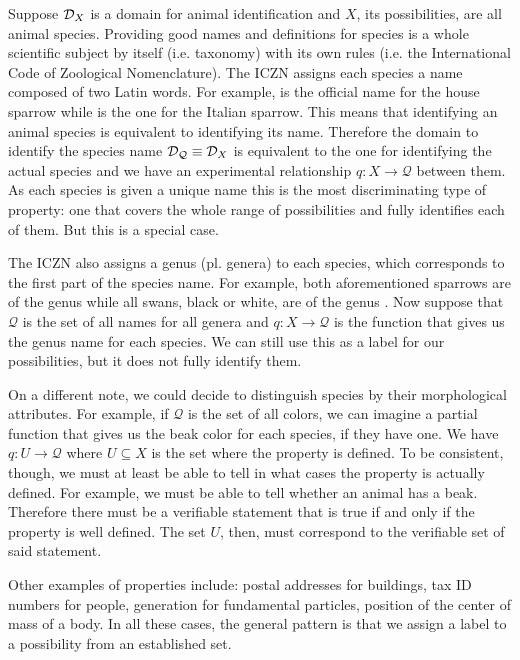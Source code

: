 \documentclass[11pt,letterpaper,fleqn]{memoir} %
\begin{document}
Suppose $\mathcal{D}_X$ is a domain for animal identification and $X$, its possibilities, are all animal species. Providing good names and definitions for species is a whole scientific subject by itself (i.e. taxonomy) with its own rules (i.e. the International Code of Zoological Nomenclature). The ICZN assigns each species a name composed of two Latin words. For example,  is the official name for the house sparrow while  is the one for the Italian sparrow. This means that identifying an animal species is equivalent to identifying its name. Therefore the domain to identify the species name $\mathcal{D}_{\mathcal{Q}} \equiv \mathcal{D}_X$ is equivalent to the one for identifying the actual species and we have an experimental relationship $q: X \to \mathcal{Q}$ between them. As each species is given a unique name this is the most discriminating type of property: one that covers the whole range of possibilities and fully identifies each of them. But this is a special case.

The ICZN also assigns a genus (pl. genera) to each species, which corresponds to the first part of the species name. For example, both aforementioned sparrows are of the genus  while all swans, black or white, are of the genus . Now suppose that $\mathcal{Q}$ is the set of all names for all genera and $q: X \to \mathcal{Q}$ is the function that gives us the genus name for each species. We can still use this as a label for our possibilities, but it does not fully identify them.

On a different note, we could decide to distinguish species by their morphological attributes. For example, if $\mathcal{Q}$ is the set of all colors, we can imagine a partial function that gives us the beak color for each species, if they have one. We have $q: U \to \mathcal{Q}$ where $U \subseteq X$ is the set where the property is defined. To be consistent, though, we must at least be able to tell in what cases the property is actually defined. For example, we must be able to tell whether an animal has a beak. Therefore there must be a verifiable statement that is true if and only if the property is well defined. The set $U$, then, must correspond to the verifiable set of said statement.

Other examples of properties include: postal addresses for buildings, tax ID numbers for people, generation for fundamental particles, position of the center of mass of a body. In all these cases, the general pattern is that we assign a label to a possibility from an established set.
\end{document}
